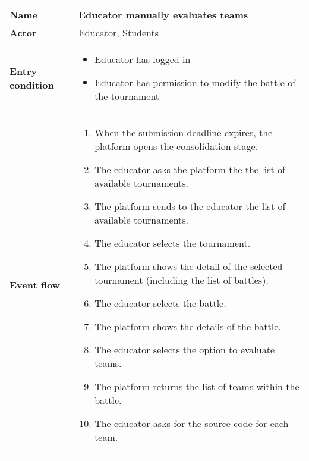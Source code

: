 \begin{enumerate}[label=\textbf{UC\arabic*}:,ref=UC\arabic*,leftmargin=1.3cm]
{\begin{table}[H]
                  \centering
                  \begin{tabular}{|l|p{11.9cm}|}
                        \hline
                        \textbf{Name}            & Educator manually evaluates teams                                                   \\\hline
                        \textbf{Actor}           & Educator, Students                                                                  \\\hline
                        \textbf{Entry condition} &
                        \begin{itemize}
                              \item Educator has logged in
                              \item Educator has permission to modify the battle of the tournament
                        \end{itemize}                                            \\\hline
                        \textbf{Event flow}      &
                        \begin{enumerate}[label=\arabic*.]
                              \item When the submission deadline expires, the platform opens the consolidation stage.
                              \item The educator asks the platform the the list of available tournaments.
                              \item The platform sends to the educator the list of available tournaments.
                              \item The educator selects the tournament.
                              \item The platform shows the detail of the selected tournament (including the list of battles).
                              \item The educator selects the battle.
                              \item The platform shows the details of the battle.
                              \item The educator selects the option to evaluate teams.
                              \item The platform returns the list of teams within the battle.
                              \item The educator asks for the source code for each team.

\end{enumerate}
\end{tabular}
\end{table}}
\end{enumerate}
